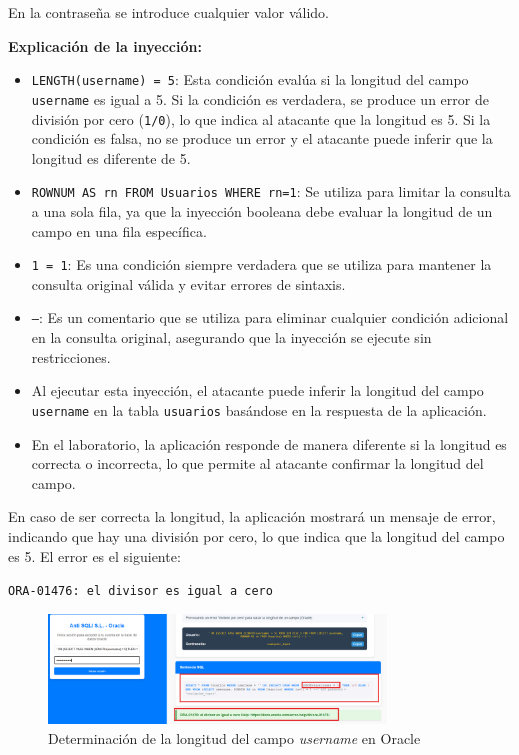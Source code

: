 \documentclass[a4paper,12pt]{article}
\begin{document}
En la contraseña se introduce cualquier valor válido.
\vspace{0,5cm}


\textbf{Explicación de la inyección:}
\begin{itemize}
    \item \texttt{LENGTH(username) = 5}: Esta condición evalúa si la longitud del campo \texttt{username} es igual a 5. Si la condición es verdadera, se produce un error de división por cero (\texttt{1/0}), lo que indica al atacante que la longitud es 5. Si la condición es falsa, no se produce un error y el atacante puede inferir que la longitud es diferente de 5.
    \item \texttt{ROWNUM AS rn FROM Usuarios WHERE rn=1}: Se utiliza para limitar la consulta a una sola fila, ya que la inyección booleana debe evaluar la longitud de un campo en una fila específica.
    \item \texttt{1 = 1}: Es una condición siempre verdadera que se utiliza para mantener la consulta original válida y evitar errores de sintaxis.
    \item \texttt{--}: Es un comentario que se utiliza para eliminar cualquier condición adicional en la consulta original, asegurando que la inyección se ejecute sin restricciones.
    \item Al ejecutar esta inyección, el atacante puede inferir la longitud del campo \texttt{username} en la tabla \texttt{usuarios} basándose en la respuesta de la aplicación.
    \item En el laboratorio, la aplicación responde de manera diferente si la longitud es correcta o incorrecta, lo que permite al atacante confirmar la longitud del campo.
\end{itemize}

\vspace{0,5cm}

En caso de ser correcta la longitud, la aplicación mostrará un mensaje de error, indicando que hay una división por cero, lo que indica que la longitud del campo es 5. El error es el siguiente: 

\begin{center}
    \texttt{ORA-01476: el divisor es igual a cero}
    \end{center}
    
\begin{figure}[H]
    \centering
    \includegraphics[width=0.8\textwidth]{Imagenes/BooleanSQLINumCT.png}
    \caption{Determinación de la longitud del campo \textit{username} en Oracle}
\end{figure}
\end{document}
